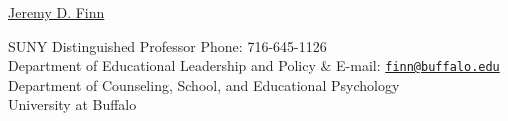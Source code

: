 \href{http://gse.buffalo.edu/about/directory/faculty/finn}{Jeremy D. Finn}
\begin{innerlist}
\item[] SUNY Distinguished Professor \hfill {Phone: 716-645-1126}\\
Department of Educational Leadership and Policy \&  \hfill{E-mail: \href{mailto:finn@buffalo.edu}{\nolinkurl{finn@buffalo.edu}}}\\
Department of Counseling, School, and Educational Psychology\\
University at Buffalo
\end{innerlist}
\halfblankline


\halfblankline




